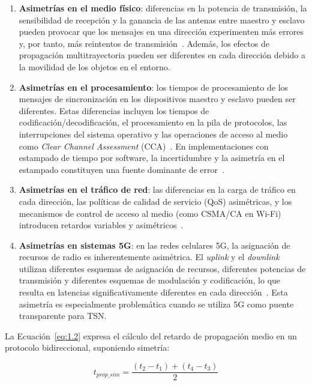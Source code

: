 \begin{enumerate}
\item \textbf{Asimetrías en el medio físico}: diferencias en la potencia de transmisión, la sensibilidad de recepción y la ganancia de las antenas entre maestro y esclavo pueden provocar que los mensajes en una dirección experimenten más errores y, por tanto, más reintentos de transmisión~\cite{barooah2007}. Además, los efectos de propagación multitrayectoria pueden ser diferentes en cada dirección debido a la movilidad de los objetos en el entorno.

\item \textbf{Asimetrías en el procesamiento}: los tiempos de procesamiento de los mensajes de sincronización en los dispositivos maestro y esclavo pueden ser diferentes. Estas diferencias incluyen los tiempos de codificación/decodificación, el procesamiento en la pila de protocolos, las interrupciones del sistema operativo y las operaciones de acceso al medio como \textit{Clear Channel Assessment} (CCA)~\cite{mahmood2014}. En implementaciones con estampado de tiempo por software, la incertidumbre y la asimetría en el estampado constituyen una fuente dominante de error~\cite{ferrari2011}.

\item \textbf{Asimetrías en el tráfico de red}: las diferencias en la carga de tráfico en cada dirección, las políticas de calidad de servicio (QoS) asimétricas, y los mecanismos de control de acceso al medio (como CSMA/CA en Wi-Fi) introducen retardos variables y asimétricos~\cite{mildner2019}.

\item \textbf{Asimetrías en sistemas 5G}: en las redes celulares 5G, la asignación de recursos de radio es inherentemente asimétrica. El \textit{uplink} y el \textit{downlink} utilizan diferentes esquemas de asignación de recursos, diferentes potencias de transmisión y diferentes esquemas de modulación y codificación, lo que resulta en latencias significativamente diferentes en cada dirección~\cite{muslim2025}. Esta asimetría es especialmente problemática cuando se utiliza 5G como puente transparente para TSN.
\end{enumerate}

La Ecuación~\ref{eq:1.2} expresa el cálculo del retardo de propagación medio en un protocolo bidireccional, suponiendo simetría:

\begin{equation}
t_{prop\_sim} = \frac{(t_2 - t_1) + (t_4 - t_3)}{2}
\label{eq:1.2}
\end{equation}

